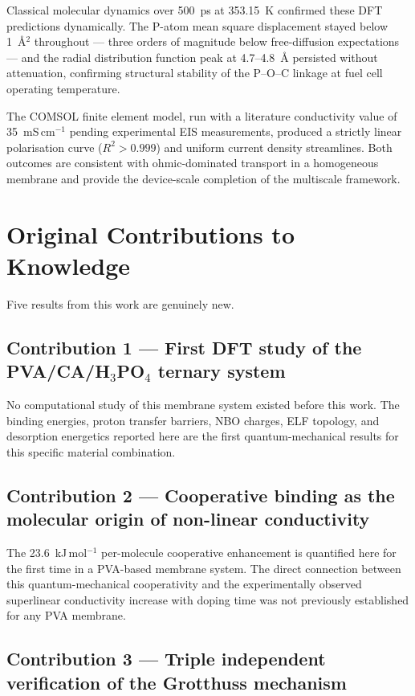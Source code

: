 \documentclass[12pt,a4paper]{report}
\begin{document}
Classical molecular dynamics over 500~ps at 353.15~K 
confirmed these DFT predictions dynamically. The 
P-atom mean square displacement stayed below 
1~\AA\(^2\) throughout — three orders of magnitude below 
free-diffusion expectations — and the radial distribution 
function peak at 4.7--4.8~\AA{} persisted without 
attenuation, confirming structural stability of the 
P--O--C linkage at fuel cell operating temperature.

The COMSOL finite element model, run with a literature 
conductivity value of 35~mS\,cm\(^{-1}\) pending 
experimental EIS measurements, produced a strictly linear 
polarisation curve ($R^2 > 0.999$) and uniform current 
density streamlines. Both outcomes are consistent with 
ohmic-dominated transport in a homogeneous membrane and 
provide the device-scale completion of the multiscale 
framework.

\section{Original Contributions to Knowledge}

Five results from this work are genuinely new.

\subsection*{Contribution 1 --- First DFT study of the 
PVA/CA/H\(_3\)PO\(_4\) ternary system}

No computational study of this membrane system existed 
before this work. The binding energies, proton transfer 
barriers, NBO charges, ELF topology, and desorption 
energetics reported here are the first quantum-mechanical 
results for this specific material combination.

\subsection*{Contribution 2 --- Cooperative binding as 
the molecular origin of non-linear conductivity}

The 23.6~kJ\,mol\(^{-1}\) per-molecule cooperative 
enhancement is quantified here for the first time in a 
PVA-based membrane system. The direct connection between 
this quantum-mechanical cooperativity and the 
experimentally observed superlinear conductivity increase 
with doping time was not previously established for any 
PVA membrane.

\subsection*{Contribution 3 --- Triple independent 
verification of the Grotthuss mechanism}
\end{document}
